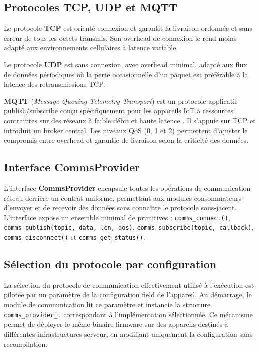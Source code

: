 \subsection{Protocoles TCP, UDP et MQTT}
\label{subsec:protocoles}

Le protocole \textbf{TCP} est orienté connexion et garantit la
livraison ordonnée et sans erreur de tous les octets transmis. Son
overhead de connexion le rend moins adapté aux environnements cellulaires
à latence variable.

Le protocole \textbf{UDP} est sans connexion, avec overhead minimal,
adapté aux flux de données périodiques où la perte occasionnelle d'un
paquet est préférable à la latence des retransmissions TCP.

\textbf{MQTT} (\textit{Message Queuing Telemetry Transport}) est un
protocole applicatif publish/subscribe conçu spécifiquement pour les
appareils IoT à ressources contraintes sur des réseaux à faible débit
et haute latence \cite{mqtt_spec}\cite{mqtt_v5}. Il s'appuie sur
TCP et introduit un broker central. Les niveaux QoS (0, 1 et 2)
permettent d'ajuster le compromis entre overhead et garantie de
livraison selon la criticité des données.

\subsection{Interface CommsProvider}
\label{subsec:commsprovider}

L'interface \textbf{CommsProvider} encapsule toutes les opérations
de communication réseau derrière un contrat uniforme, permettant
aux modules consommateurs d'envoyer et de recevoir des données sans
connaître le protocole sous-jacent. L'interface expose un ensemble
minimal de primitives : \texttt{comms\_connect()},
\texttt{comms\_publish(topic, data, len, qos)},
\texttt{comms\_subscribe(topic, callback)},
\texttt{comms\_disconnect()} et \texttt{comms\_get\_status()}.

\subsection{Sélection du protocole par configuration}
\label{subsec:proto_select}

La sélection du protocole de communication effectivement utilisé à
l'exécution est pilotée par un paramètre de la configuration field
de l'appareil. Au démarrage, le module de communication lit ce
paramètre et instancie la structure \texttt{comms\_provider\_t}
correspondant à l'implémentation sélectionnée. Ce mécanisme permet
de déployer le même binaire firmware sur des appareils destinés à
différentes infrastructures serveur, en modifiant uniquement la
configuration sans recompilation.

